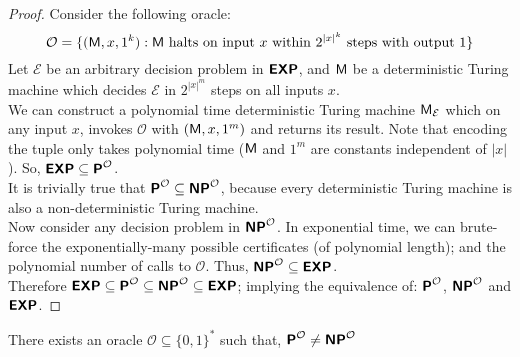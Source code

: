 \documentclass[usletter]{article}
\newcommand {\langset}[1]      {\ensuremath{\mathcal{#1}}}
\newcommand {\machine}[1]      {\ensuremath{\textnormal{\textsf{#1}}}}
\newcommand {\family}[1]       {\ensuremath{\textnormal{\textsf{\textbf{#1}}}}}
\begin{document}
\begin{proof}
Consider the following oracle:
$$ \langset{O} = \{ (\machine{M}, x, 1^k)
  : \machine{M} \textnormal{ halts on input } x
  \textnormal{ within } 2^{{|x|}^k} \textnormal{ steps with output } 1 \} $$
Let \langset{E} be an arbitrary decision problem in \family{EXP}, and
\machine{M} be a deterministic Turing machine which decides \langset{E} in
$2^{{|x|}^m}$ steps on all inputs $x$. \\
We can construct a polynomial time deterministic Turing machine
$\machine{M}_\langset{E}$ which on any input $x$, invokes \langset{O} with
$(\machine{M}, x, 1^m)$ and returns its result. Note that encoding the tuple
only takes polynomial time ($\machine{M}$ and $1^m$ are constants independent of
$|x|$). So, $\family{EXP} \subseteq \family{P}^\langset{O}$. \\

\noindent
It is trivially true that
$\family{P}^\langset{O} \subseteq \family{NP}^\langset{O}$, because every
deterministic Turing machine is also a non-deterministic Turing machine. \\

\noindent
Now consider any decision problem in $\family{NP}^\langset{O}$. In exponential
time, we can brute-force the exponentially-many possible certificates
(of polynomial length); and the polynomial number of calls to \langset{O}.
Thus, $\family{NP}^\langset{O} \subseteq \family{EXP}$. \\

\noindent
Therefore $\family{EXP} \subseteq \family{P}^\langset{O}
                        \subseteq \family{NP}^\langset{O}
                        \subseteq \family{EXP}$; implying the equivalence of:
$\family{P}^\langset{O}$, $\family{NP}^\langset{O}$ and $\family{EXP}$.
\end{proof}

\begin{theorem}
There exists an oracle $\langset{O} \subseteq \{0,1\}^*$ such that,
$\family{P}^\langset{O} \neq \family{NP}^\langset{O}$
\end{theorem}
\end{document}
